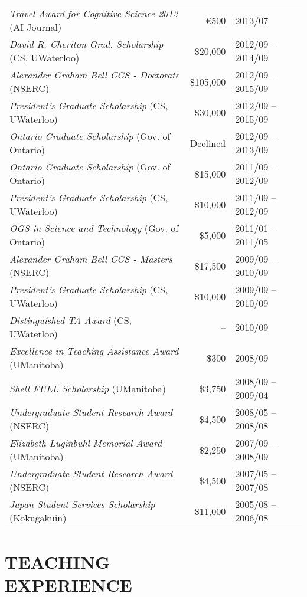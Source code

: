 \documentclass[line,margin]{res}
\begin{document}
\begin{resume}
\begin{tabular}{lrl}
{\sl Travel Award for Cognitive Science 2013} (AI Journal) &
\euro{}500 & 2013/07 \\
{\sl David R. Cheriton Grad. Scholarship} (CS, UWaterloo) &
\$20,000 & 2012/09 -- 2014/09 \\
{\sl Alexander Graham Bell CGS - Doctorate} (NSERC) &
\$105,000 & 2012/09 -- 2015/09 \\
{\sl President's Graduate Scholarship} (CS, UWaterloo) &
\$30,000 & 2012/09 -- 2015/09 \\
{\sl Ontario Graduate Scholarship} (Gov. of Ontario) &
Declined & 2012/09 -- 2013/09 \\
{\sl Ontario Graduate Scholarship} (Gov. of Ontario) &
\$15,000 & 2011/09 -- 2012/09 \\
{\sl President's Graduate Scholarship} (CS, UWaterloo) &
\$10,000 & 2011/09 -- 2012/09 \\
{\sl OGS in Science and Technology} (Gov. of Ontario) &
\$5,000 & 2011/01 -- 2011/05 \\
{\sl Alexander Graham Bell CGS - Masters} (NSERC) &
\$17,500 & 2009/09 -- 2010/09 \\
{\sl President's Graduate Scholarship} (CS, UWaterloo) &
\$10,000 & 2009/09 -- 2010/09 \\
{\sl Distinguished TA Award} (CS, UWaterloo) &
-- & 2010/09 \\
{\sl Excellence in Teaching Assistance Award} (UManitoba) &
\$300 & 2008/09 \\
{\sl Shell FUEL Scholarship} (UManitoba) &
\$3,750 & 2008/09 -- 2009/04 \\
{\sl Undergraduate Student Research Award} (NSERC) &
\$4,500 & 2008/05 -- 2008/08 \\
{\sl Elizabeth Luginbuhl Memorial Award} (UManitoba) &
\$2,250 & 2007/09 -- 2008/09 \\
{\sl Undergraduate Student Research Award} (NSERC) &
\$4,500 & 2007/05 -- 2007/08 \\
{\sl Japan Student Services Scholarship} (Kokugakuin) &
\$11,000 & 2005/08 -- 2006/08
\end{tabular}

\section{TEACHING \\EXPERIENCE}


\end{resume}
\end{document}
